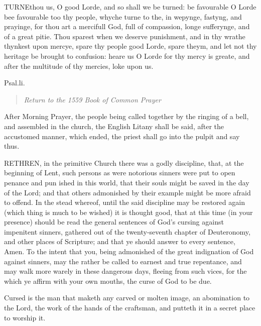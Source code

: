 TURNE\textbf{}thou us, O good Lorde, and so shall we be turned: be favourable O
Lorde bee favourable too thy people, whyche turne to the, in wepynge,
fastyng, and prayinge, for thou art a mercifull God, full of compassion,
longe sufferynge, and of a great pitie. Thou sparest when we deserve punishment,
and in thy wrathe thynkest upon mercye, spare thy people good Lorde, spare
theym, and let not thy heritage be brought to confusion: heare us O Lorde
for thy mercy is greate, and after the multitude of thy mercies, loke
upon us. 

Psal.\textbf{}li.

\begin{quote}

\emph{Return to the 1559
Book of Common Prayer}

\end{quote}



After Morning Prayer, the people being called
together by the ringing of a bell, and assembled in the church, the English Litany shall
be said, after the accustomed manner, which ended, the priest shall go into the pulpit and
say thus.

RETHREN,
in the primitive Church there was a godly discipline, that, at the beginning of Lent, such
persons as were notorious sinners were put to open penance and pun ished in this world,
that their souls might be saved in the day of the Lord; and that others admonished by
their example might be more afraid to offend. In the stead whereof, until the said
discipline may be restored again (which thing is much to be wished) it is thought good,
that at this time (in your presence) should be read the general sentences of God's cursing
against impenitent sinners, gathered out of the twenty-seventh chapter of Deuteronomy, and
other places of Scripture; and that ye should answer to every sentence, Amen. To the
intent that you, being admonished of the great indignation of God against sinners, may the
rather be called to earnest and true repentance, and may walk more warely in these
dangerous days, fleeing from such vices, for the which ye affirm with your own mouths, the
curse of God to be due.

Cursed is the man that maketh any carved or molten image, an
abomination to the Lord, the work of the hands of the craftsman, and putteth it in a
secret place to worship it.

